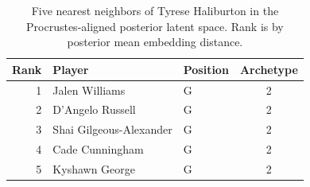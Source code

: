 \begin{table}[htbp]
  \centering\small
  \begin{tabular}{rllc}
    \toprule
    Rank & Player & Position & Archetype \\
    \midrule
    1 & Jalen Williams & G & 2 \\
    2 & D'Angelo Russell & G & 2 \\
    3 & Shai Gilgeous-Alexander & G & 2 \\
    4 & Cade Cunningham & G & 2 \\
    5 & Kyshawn George & G & 2 \\
    \bottomrule
  \end{tabular}
  \caption{Five nearest neighbors of Tyrese Haliburton in the Procrustes-aligned posterior latent space. Rank is by posterior mean embedding distance.}
  \label{tab:Tyrese_Haliburton_neighbors}
\end{table}

